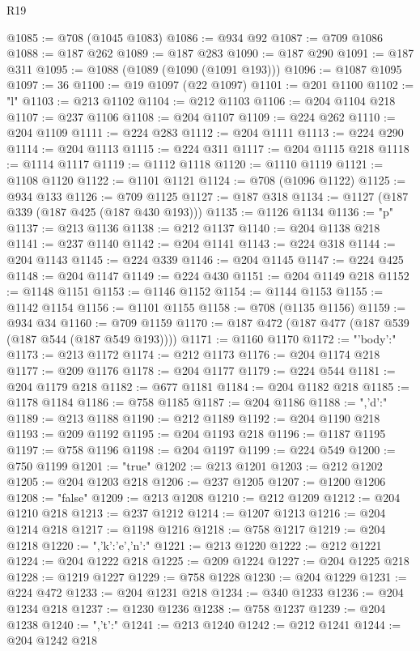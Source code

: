 \begin{lexlean}{R19}
\begin{coremodule}
{{@1085 := @708 (@1045 @1083)
@1086 := @934 @92
@1087 := @709 @1086
@1088 := @187 @262
@1089 := @187 @283
@1090 := @187 @290
@1091 := @187 @311
@1095 := @1088 (@1089 (@1090 (@1091 @193)))
@1096 := @1087 @1095
@1097 := 36
@1100 := @19 @1097 (@22 @1097)
@1101 := @201 @1100
@1102 := "l"
@1103 := @213 @1102
@1104 := @212 @1103
@1106 := @204 @1104 @218
@1107 := @237 @1106
@1108 := @204 @1107
@1109 := @224 @262
@1110 := @204 @1109
@1111 := @224 @283
@1112 := @204 @1111
@1113 := @224 @290
@1114 := @204 @1113
@1115 := @224 @311
@1117 := @204 @1115 @218
@1118 := @1114 @1117
@1119 := @1112 @1118
@1120 := @1110 @1119
@1121 := @1108 @1120
@1122 := @1101 @1121
@1124 := @708 (@1096 @1122)
@1125 := @934 @133
@1126 := @709 @1125
@1127 := @187 @318
@1134 := @1127 (@187 @339 (@187 @425 (@187 @430 @193)))
@1135 := @1126 @1134
@1136 := "p"
@1137 := @213 @1136
@1138 := @212 @1137
@1140 := @204 @1138 @218
@1141 := @237 @1140
@1142 := @204 @1141
@1143 := @224 @318
@1144 := @204 @1143
@1145 := @224 @339
@1146 := @204 @1145
@1147 := @224 @425
@1148 := @204 @1147
@1149 := @224 @430
@1151 := @204 @1149 @218
@1152 := @1148 @1151
@1153 := @1146 @1152
@1154 := @1144 @1153
@1155 := @1142 @1154
@1156 := @1101 @1155
@1158 := @708 (@1135 @1156)
@1159 := @934 @34
@1160 := @709 @1159
@1170 := @187 @472 (@187 @477 (@187 @539 (@187 @544 (@187 @549 @193))))
@1171 := @1160 @1170
@1172 := "{'body':"
@1173 := @213 @1172
@1174 := @212 @1173
@1176 := @204 @1174 @218
@1177 := @209 @1176
@1178 := @204 @1177
@1179 := @224 @544
@1181 := @204 @1179 @218
@1182 := @677 @1181
@1184 := @204 @1182 @218
@1185 := @1178 @1184
@1186 := @758 @1185
@1187 := @204 @1186
@1188 := ",'d':"
@1189 := @213 @1188
@1190 := @212 @1189
@1192 := @204 @1190 @218
@1193 := @209 @1192
@1195 := @204 @1193 @218
@1196 := @1187 @1195
@1197 := @758 @1196
@1198 := @204 @1197
@1199 := @224 @549
@1200 := @750 @1199
@1201 := "true"
@1202 := @213 @1201
@1203 := @212 @1202
@1205 := @204 @1203 @218
@1206 := @237 @1205
@1207 := @1200 @1206
@1208 := "false"
@1209 := @213 @1208
@1210 := @212 @1209
@1212 := @204 @1210 @218
@1213 := @237 @1212
@1214 := @1207 @1213
@1216 := @204 @1214 @218
@1217 := @1198 @1216
@1218 := @758 @1217
@1219 := @204 @1218
@1220 := ",'k':'e','n':"
@1221 := @213 @1220
@1222 := @212 @1221
@1224 := @204 @1222 @218
@1225 := @209 @1224
@1227 := @204 @1225 @218
@1228 := @1219 @1227
@1229 := @758 @1228
@1230 := @204 @1229
@1231 := @224 @472
@1233 := @204 @1231 @218
@1234 := @340 @1233
@1236 := @204 @1234 @218
@1237 := @1230 @1236
@1238 := @758 @1237
@1239 := @204 @1238
@1240 := ",'t':"
@1241 := @213 @1240
@1242 := @212 @1241
@1244 := @204 @1242 @218
}}}
\end{coremodule}
\end{lexlean}
